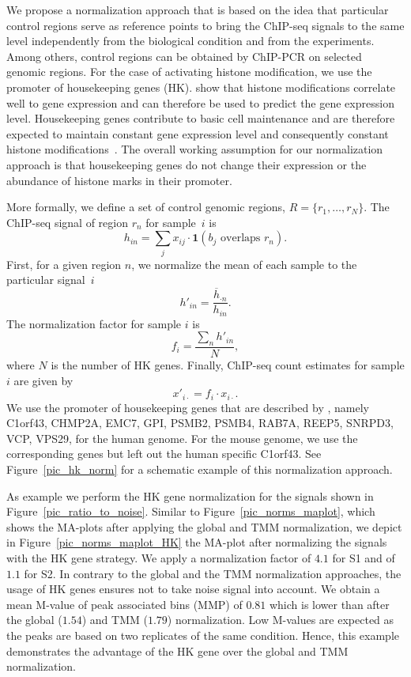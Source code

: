 We propose a normalization approach that is based on the idea that particular control regions serve as reference points to bring the ChIP-seq signals to the same level independently from the biological condition and from the experiments.
Among others, control regions can be obtained by ChIP-PCR on selected genomic regions. 
For the case of activating histone modification, we use the promoter of housekeeping genes (HK). 
\cite{Karlic2010} show that histone modifications correlate well to gene expression and can therefore be used to predict the gene expression level.
Housekeeping genes contribute to basic cell maintenance and are therefore expected to maintain constant gene expression level and consequently constant histone modifications~\citep{Eisenberg2013}.
The overall working assumption for our normalization approach is that housekeeping genes do not change their expression or the abundance of histone marks in their promoter.

More formally, we define a set of control genomic regions, $R=\{r_1, \ldots ,r_N\}$. The ChIP-seq signal of region $r_n$ for sample~$i$ is
$$h_{in} = \sum_j {x_{ij} \cdot \mathbf{1}(b_j \text{ overlaps } r_n )}.$$
\noindent
First, for a given region $n$, we normalize the mean of each sample to the particular signal~$i$
$$h'_{in} = \frac{\overline{h}_{\cdot n}}{h_{in}}.$$
\noindent
The normalization factor for sample $i$ is 
$$f_i = \frac{\sum_n h'_{in}}{N},$$
where $N$ is the number of HK genes. 
\noindent
Finally, ChIP-seq count estimates for sample $i$ are given by
$$x'_{i\cdot} = f_i \cdot x_{i\cdot}.$$
\noindent 
We use the promoter of housekeeping genes that are described by \cite{Eisenberg2013}, namely C1orf43, CHMP2A, EMC7, GPI, PSMB2, PSMB4, RAB7A, REEP5, SNRPD3, VCP, VPS29, for the human genome.
For the mouse genome, we use the corresponding genes but left out the human specific C1orf43. 
See Figure~\ref{pic_hk_norm} for a schematic example of this normalization approach.

As example we perform the HK gene normalization for the signals shown in Figure~\ref{pic_ratio_to_noise}.
Similar to Figure~\ref{pic_norms_maplot}, which shows the MA-plots after applying the global and TMM normalization, we depict in Figure~\ref{pic_norms_maplot_HK} the MA-plot after normalizing the signals with the HK gene strategy.
We apply a normalization factor of $4.1$ for S1 and of $1.1$ for S2.
In contrary to the global and the TMM normalization approaches, the usage of HK genes ensures not to take noise signal into account.
We obtain a mean M-value of peak associated bins (MMP) of $0.81$ which is lower than after the global ($1.54$) and TMM ($1.79$) normalization.
Low M-values are expected as the peaks are based on two replicates of the same condition.
Hence, this example demonstrates the advantage of the HK gene over the global and TMM normalization.

